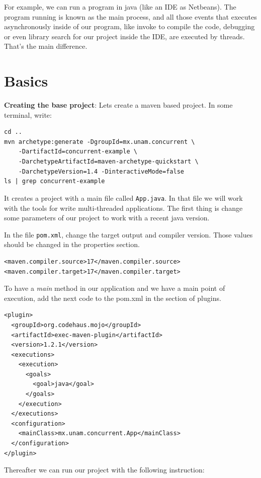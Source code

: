 \documentclass[openany, a4paper]{book}
\theoremstyle{break}
\theoremstyle{example}
\theoremstyle{note}
\theoremstyle{break}
\theoremstyle{exercise}
\begin{document}
For example, we can run a program in java (like an IDE as Netbeans). The
program running is known as the main process, and all those events that
executes asynchronously inside of our program, like invoke to compile the
code, debugging or even library search for our project inside the IDE, are
executed by threads. That's the main difference.


\section{Basics}
\label{sec:org78d19f2}

\textbf{Creating the base project}: Lets create a maven based project. In some
terminal, write:

\begin{verbatim}
cd ..
mvn archetype:generate -DgroupId=mx.unam.concurrent \
    -DartifactId=concurrent-example \
    -DarchetypeArtifactId=maven-archetype-quickstart \
    -DarchetypeVersion=1.4 -DinteractiveMode=false
ls | grep concurrent-example
\end{verbatim}

It creates a project with a main file called \texttt{App.java}. In that file we
will work with the tools for write multi-threaded applications. The first
thing is change some parameters of our project to work with a recent
java version.

In the file \texttt{pom.xml}, change the target output and compiler version. Those
values should be changed in the properties section.

\begin{verbatim}
<maven.compiler.source>17</maven.compiler.source>
<maven.compiler.target>17</maven.compiler.target>
\end{verbatim}

To have a \emph{main} method in our application and we have a main point of
execution, add the next code to the pom.xml in the section of plugins.

\begin{verbatim}
<plugin>
  <groupId>org.codehaus.mojo</groupId>
  <artifactId>exec-maven-plugin</artifactId>
  <version>1.2.1</version>
  <executions>
    <execution>
      <goals>
        <goal>java</goal>
      </goals>
    </execution>
  </executions>
  <configuration>
    <mainClass>mx.unam.concurrent.App</mainClass>
  </configuration>
</plugin>
\end{verbatim}

Thereafter we can run our project with the following instruction:
\end{document}
